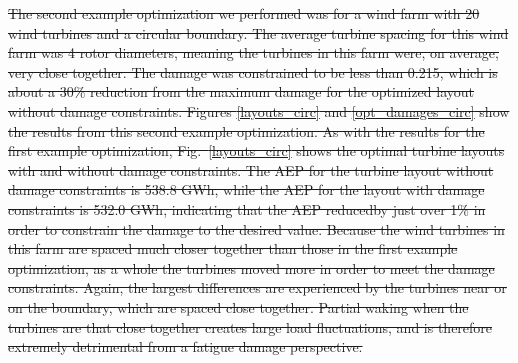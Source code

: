 \documentclass[11pt,letterpaper]{article}
\providecommand{\DIFdel}[1]{{\protect\color{red}\sout{#1}}}                      %
\begin{document}

\DIFdel{The second example optimization we performed was for a wind farm with 20 wind turbines and a circular boundary. The average turbine spacing for this wind farm was 4 rotor diameters, meaning the turbines in this farm were, on average, very close together. The damage was constrained to be less than 0.215, which is about a 30\% reduction from the maximum damage for the optimized layout without damage constraints.
Figures \ref{layouts_circ} and \ref{opt_damages_circ} show the results from this second example optimization. As with the results for the first example optimization, Fig.~\ref{layouts_circ} shows the optimal turbine layouts with and without damage constraints. The AEP for the turbine layout without damage constraints is 538.8 GWh, while the AEP for the layout with damage constraints is 532.0 GWh, indicating that the AEP reducedby just over 1\% in order to constrain the damage to the desired value. Because the wind turbines in this farm are spaced much closer together than those in the first example optimization, as a whole the turbines moved more in order to meet the damage constraints. Again, the largest differences are experienced by the turbines near or on the boundary, which are spaced close together. Partial waking when the turbines are that close together creates large load fluctuations, and is therefore extremely detrimental from a fatigue damage perspective. }%
\end{document}
